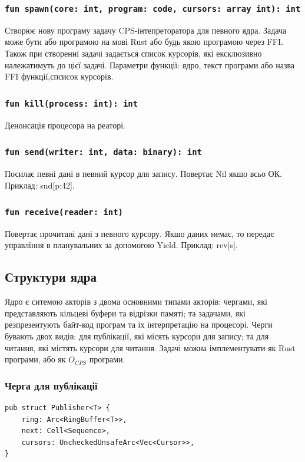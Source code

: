 \documentclass{article}
\begin{document}
\subsubsection*{\lstinline{fun spawn(core: int, program: code, cursors: array int): int}}
Створює нову програму задачу CPS-інтепреторатора для певного ядра.
Задача може бути або програмою на мові Rust або будь якою програмою через FFI.
Також при створенні задачі задається список курсорів,
які ексклюзивно належатимуть до цієї задачі.
Параметри функції: ядро, текст програми або назва FFI функції,спсисок курсорів.

\subsubsection*{\lstinline{fun kill(process: int): int}}
Денонсація процесора на реаторі.

\subsubsection*{\lstinline{fun send(writer: int, data: binary): int}}
Посилає певні дані в певний курсор для запису. Повертає Nil якшо всьо ОК.
Приклад: snd[p;42].

\subsubsection*{\lstinline{fun receive(reader: int)}}
Повертає прочитані дані з певного курсору.
Якшо даних немає, то передає управління в планувальних за допомогою Yield.
Приклад: rcv[s].

\newpage
\subsection{Структури ядра}
Ядро є ситемою акторів з двома основними типами акторів:
чергами, які представляють кільцеві буфери та відрізки памяті;
та задачами, які резпрезентують байт-код програм та іх інтерпретацію на процесорі.
Черги бувають двох видів: для публікації, які місять курсори для запису;
та для читання, які містять курсори для читання. Задачі можна імплементувати
як Rust програми, або як $O_{CPS}$ програми.

\subsubsection{Черга для публікації}
\begin{lstlisting}
pub struct Publisher<T> {
    ring: Arc<RingBuffer<T>>,
    next: Cell<Sequence>,
    cursors: UncheckedUnsafeArc<Vec<Cursor>>,
}
\end{lstlisting}
\end{document}
